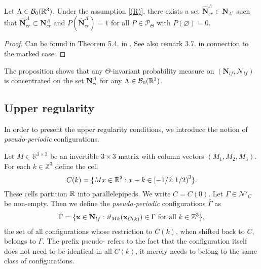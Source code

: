 \begin{proposition}\label{prop:cr-a.s.}
	Let $\Lambda \in \mathcal B_0({\mathbb R^3})$. Under the assumption \ref{(R)}, there exists a set $\hat {\mathbf N}^\Lambda_{cr} \in \mathbf N_{\Lambda^c}$ such that $\hat {\mathbf N}^\Lambda_{cr} \subset \mathbf N^\Lambda_{cr}$ and $P(\hat {\mathbf N}^\Lambda_{cr})=1$ for all $P \in \mathcal P_\Theta$ with $P(\varnothing)=0$.
\end{proposition}
\begin{proof}
	Can be found in Theorem 5.4. in \cite{DDG12}. See also remark 3.7. in connection to the marked case.
\end{proof}

The proposition shows that any $\Theta$-invariant probability measure on $(\mathbf N_{lf},\mathcal N_{lf})$ is concentrated on the set $\mathbf N^\Lambda_{cr}$ for any $\Lambda \in \mathcal B_0({\mathbb R^3})$.

\subsection{Upper regularity}


In order to present the upper regularity conditions, we introduce the notion of \textit{pseudo-periodic} configurations. 

Let $M\in\mathbb R^{3\times 3}$ be an invertible $3\times 3$ matrix with column vectors $(M_1,M_2,M_3)$. For each $k \in \mathbb Z^3$ define the cell
$$C(k) =  \{Mx \in {\mathbb R^3}: x-k \in \left[ -1/2, 1/2 \right)^3 \}.$$
These cells partition $\mathbb{R}$ into parallelepipeds. We write $C=C(0)$. Let  $\Gamma \in \mathcal N'_C$ be non-empty. Then we define the \textit{pseudo-periodic} configurations $\bar \Gamma$ as
$$\bar \Gamma = \{ {\mathbf{x}} \in \mathbf N_{lf}: \vartheta_{Mk}({\mathbf{x}}_{C(k)}) \in \Gamma \text{ for all } k \in \mathbb Z^3 \},$$
the set of all configurations whose restriction to $C(k)$, when shifted back to $C$, belongs to $\Gamma$. The prefix pseudo- refers to the fact that the configuration itself does not need to be identical in all $C(k)$, it merely needs to belong to the same class of configurations.

